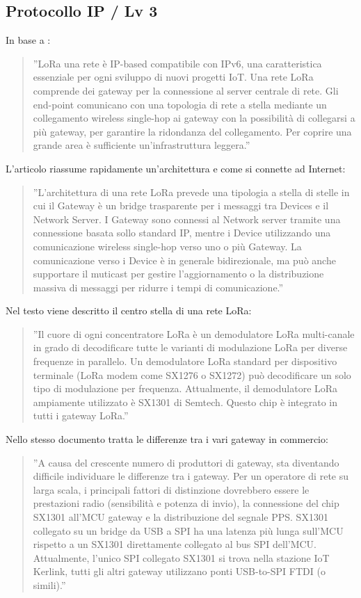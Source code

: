 \documentclass[a4paper]{report} %
\begin{document}
\subsection{Protocollo IP / Lv 3} 
In base a \cite{art:rif.20}:
\begin{quote}
	''LoRa una rete è IP-based compatibile con IPv6, una caratteristica essenziale per ogni sviluppo di nuovi progetti IoT. Una rete LoRa comprende dei gateway per la connessione al server centrale di rete. Gli end-point comunicano con una topologia di rete a stella mediante un collegamento wireless single-hop ai gateway con la possibilità di collegarsi a più gateway, per garantire la ridondanza del collegamento. Per coprire una grande area è sufficiente un'infrastruttura leggera.''
\end{quote}
L'articolo \cite{art:rif.25} riassume rapidamente un'architettura e come si connette ad Internet:
\begin{quote}
	''L'architettura di una rete LoRa prevede una tipologia a stella di stelle in cui il Gateway è un bridge trasparente per i messaggi tra Devices e il Network Server. I Gateway sono connessi al Network server tramite una connessione basata sollo standard IP, mentre i Device utilizzando una comunicazione wireless single-hop verso uno o più Gateway. La comunicazione verso i Device è in generale bidirezionale, ma può anche supportare il muticast per gestire l'aggiornamento o la distribuzione massiva di messaggi per ridurre i tempi di comunicazione.''
\end{quote}
Nel testo \cite{art:rif.30} viene descritto il centro stella di una rete LoRa:
\begin{quote}
	''Il cuore di ogni concentratore LoRa è un demodulatore LoRa multi-canale in grado di decodificare tutte le varianti di modulazione LoRa per diverse frequenze in parallelo. Un demodulatore LoRa standard per dispositivo terminale (LoRa modem come SX1276 o SX1272) può decodificare un solo tipo di modulazione per frequenza. Attualmente, il demodulatore LoRa ampiamente utilizzato è SX1301 di Semtech. Questo chip è integrato in tutti i gateway LoRa.''
\end{quote}
Nello stesso documento tratta le differenze tra i vari gateway in commercio:
\begin{quote}
	''A causa del crescente numero di produttori di gateway, sta diventando difficile individuare le differenze tra i gateway. Per un operatore di rete su larga scala, i principali fattori di distinzione dovrebbero essere le prestazioni radio (sensibilità e potenza di invio), la connessione del chip SX1301 all'MCU gateway e la distribuzione del segnale PPS. SX1301 collegato su un bridge da USB a SPI ha una latenza più lunga sull'MCU rispetto a un SX1301 direttamente collegato al bus SPI dell'MCU. Attualmente, l'unico SPI collegato SX1301 si trova nella stazione IoT Kerlink, tutti gli altri gateway utilizzano ponti USB-to-SPI FTDI (o simili).'' 
\end{quote}
\end{document}
